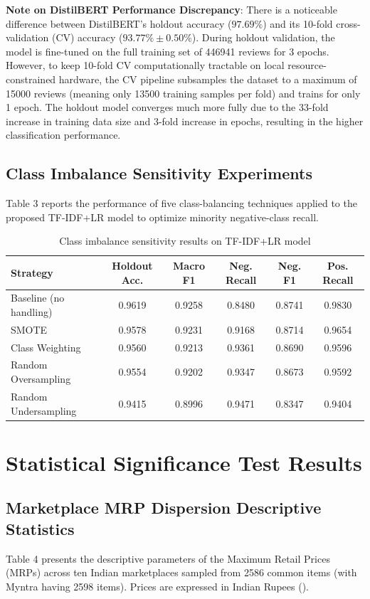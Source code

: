 \documentclass[11pt]{article}
\begin{document}
\noindent \textbf{Note on DistilBERT Performance Discrepancy}: There is a noticeable difference between DistilBERT's holdout accuracy ($97.69\%$) and its 10-fold cross-validation (CV) accuracy ($93.77\% \pm 0.50\%$). During holdout validation, the model is fine-tuned on the full training set of 446941 reviews for 3 epochs. However, to keep 10-fold CV computationally tractable on local resource-constrained hardware, the CV pipeline subsamples the dataset to a maximum of 15000 reviews (meaning only 13500 training samples per fold) and trains for only 1 epoch. The holdout model converges much more fully due to the 33-fold increase in training data size and 3-fold increase in epochs, resulting in the higher classification performance.


\subsection{Class Imbalance Sensitivity Experiments}
Table 3 reports the performance of five class-balancing techniques applied to the proposed TF-IDF+LR model to optimize minority negative-class recall.

\begin{table}[H]
\centering
\small
\caption{Class imbalance sensitivity results on TF-IDF+LR model}
\begin{tabular}{lccccc}
\toprule
\textbf{Strategy} & \textbf{Holdout Acc.} & \textbf{Macro F1} & \textbf{Neg. Recall} & \textbf{Neg. F1} & \textbf{Pos. Recall} \\ 
\midrule
Baseline (no handling) & 0.9619 & 0.9258 & 0.8480 & 0.8741 & 0.9830 \\
SMOTE & 0.9578 & 0.9231 & 0.9168 & 0.8714 & 0.9654 \\
Class Weighting & 0.9560 & 0.9213 & 0.9361 & 0.8690 & 0.9596 \\
Random Oversampling & 0.9554 & 0.9202 & 0.9347 & 0.8673 & 0.9592 \\
Random Undersampling & 0.9415 & 0.8996 & 0.9471 & 0.8347 & 0.9404 \\
\bottomrule
\end{tabular}
\end{table}


\section{Statistical Significance Test Results}

\subsection{Marketplace MRP Dispersion Descriptive Statistics}
Table 4 presents the descriptive parameters of the Maximum Retail Prices (MRPs) across ten Indian marketplaces sampled from 2586 common items (with Myntra having 2598 items). Prices are expressed in Indian Rupees (\rupee).
\end{document}
